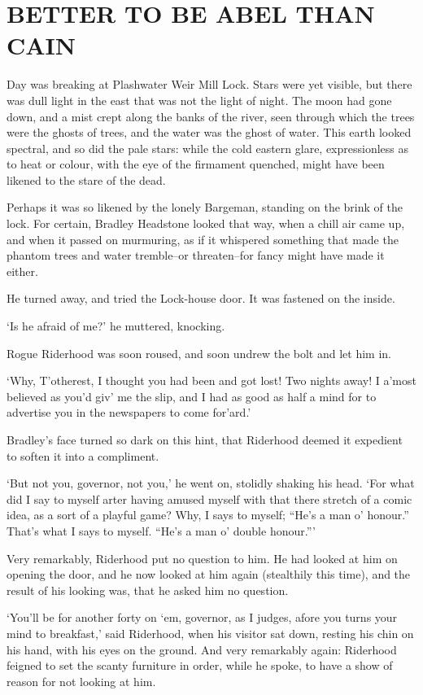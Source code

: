 
\chapter{BETTER TO BE ABEL THAN CAIN}

Day was breaking at Plashwater Weir Mill Lock. Stars were yet visible,
but there was dull light in the east that was not the light of night.
The moon had gone down, and a mist crept along the banks of the river,
seen through which the trees were the ghosts of trees, and the water
was the ghost of water. This earth looked spectral, and so did the
pale stars: while the cold eastern glare, expressionless as to heat or
colour, with the eye of the firmament quenched, might have been likened
to the stare of the dead.

Perhaps it was so likened by the lonely Bargeman, standing on the brink
of the lock. For certain, Bradley Headstone looked that way, when a
chill air came up, and when it passed on murmuring, as if it
whispered something that made the phantom trees and water tremble--or
threaten--for fancy might have made it either.

He turned away, and tried the Lock-house door. It was fastened on the
inside.

‘Is he afraid of me?’ he muttered, knocking.

Rogue Riderhood was soon roused, and soon undrew the bolt and let him
in.

‘Why, T’otherest, I thought you had been and got lost! Two nights away!
I a’most believed as you’d giv’ me the slip, and I had as good as half a
mind for to advertise you in the newspapers to come for’ard.’

Bradley’s face turned so dark on this hint, that Riderhood deemed it
expedient to soften it into a compliment.

‘But not you, governor, not you,’ he went on, stolidly shaking his head.
‘For what did I say to myself arter having amused myself with that there
stretch of a comic idea, as a sort of a playful game? Why, I says to
myself; “He’s a man o’ honour.” That’s what I says to myself. “He’s a
man o’ double honour.”’

Very remarkably, Riderhood put no question to him. He had looked at him
on opening the door, and he now looked at him again (stealthily this
time), and the result of his looking was, that he asked him no question.

‘You’ll be for another forty on ‘em, governor, as I judges, afore you
turns your mind to breakfast,’ said Riderhood, when his visitor sat
down, resting his chin on his hand, with his eyes on the ground. And
very remarkably again: Riderhood feigned to set the scanty furniture in
order, while he spoke, to have a show of reason for not looking at him.

